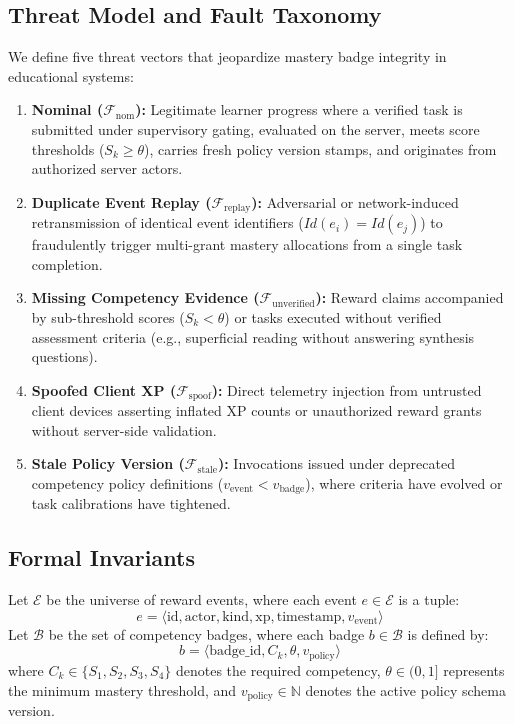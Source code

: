 \documentclass[11pt,a4paper]{article}
\begin{document}
\subsection{Threat Model and Fault Taxonomy}
We define five threat vectors that jeopardize mastery badge integrity in educational systems:
\begin{enumerate}[label=\textbf{F\arabic*.}]
    \item \textbf{Nominal ($\mathcal{F}_{\text{nom}}$):} Legitimate learner progress where a verified task is submitted under supervisory gating, evaluated on the server, meets score thresholds ($S_k \ge \theta$), carries fresh policy version stamps, and originates from authorized server actors.
    \item \textbf{Duplicate Event Replay ($\mathcal{F}_{\text{replay}}$):} Adversarial or network-induced retransmission of identical event identifiers ($Id(e_i) = Id(e_j)$) to fraudulently trigger multi-grant mastery allocations from a single task completion.
    \item \textbf{Missing Competency Evidence ($\mathcal{F}_{\text{unverified}}$):} Reward claims accompanied by sub-threshold scores ($S_k < \theta$) or tasks executed without verified assessment criteria (e.g., superficial reading without answering synthesis questions).
    \item \textbf{Spoofed Client XP ($\mathcal{F}_{\text{spoof}}$):} Direct telemetry injection from untrusted client devices asserting inflated XP counts or unauthorized reward grants without server-side validation.
    \item \textbf{Stale Policy Version ($\mathcal{F}_{\text{stale}}$):} Invocations issued under deprecated competency policy definitions ($v_{\text{event}} < v_{\text{badge}}$), where criteria have evolved or task calibrations have tightened.
\end{enumerate}

\subsection{Formal Invariants}
Let $\mathcal{E}$ be the universe of reward events, where each event $e \in \mathcal{E}$ is a tuple:
\begin{equation}
e = \langle \text{id}, \text{actor}, \text{kind}, \text{xp}, \text{timestamp}, v_{\text{event}} \rangle
\end{equation}
Let $\mathcal{B}$ be the set of competency badges, where each badge $b \in \mathcal{B}$ is defined by:
\begin{equation}
b = \langle \text{badge\_id}, C_k, \theta, v_{\text{policy}} \rangle
\end{equation}
where $C_k \in \{S_1, S_2, S_3, S_4\}$ denotes the required competency, $\theta \in (0, 1]$ represents the minimum mastery threshold, and $v_{\text{policy}} \in \mathbb{N}$ denotes the active policy schema version.
\end{document}
